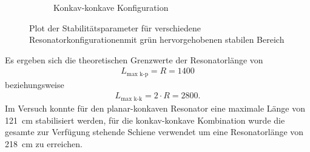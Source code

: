 \begin{figure}[H]
\begin{subfigure}[b]{0.48\textwidth}
        \caption{Konkav-konkave Konfiguration}
        \label{fig:kette_b}
    \end{subfigure}
    \caption{Plot der Stabilitätsparameter für verschiedene Resonatorkonfigurationenmit grün hervorgehobenen stabilen Bereich}
    \label{fig:kette}
\end{figure}
Es ergeben sich die theoretischen Grenzwerte der Resonatorlänge von 
\begin{align}
    L_\text{max k-p}=R=1400
\end{align}
beziehungsweise 
\begin{align}
    L_\text{max k-k}=2\cdot R=2800\text{.}
\end{align}
Im Versuch konnte für den planar-konkaven Resonator eine maximale Länge von \SI{121}{\centi\meter} stabilisiert werden, für die konkav-konkave Kombination wurde die gesamte zur Verfügung stehende Schiene verwendet um eine Resonatorlänge von \SI{218}{\centi\meter} zu erreichen.

